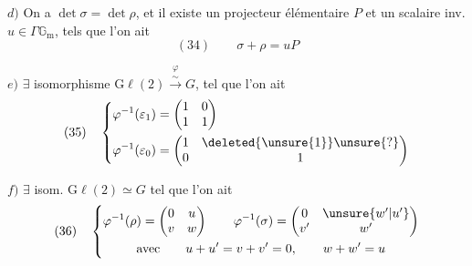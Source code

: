 $d)$ On a $\det\sigma=\det\rho$, et il existe un projecteur élémentaire $P$ et un scalaire inv. $u\in\Gamma\mathbb G_{\mathrm m}$, tels que l'on ait
\[
(34)\qquad \sigma+\rho=uP
\]




$e)$ $\exists$ isomorphisme $\mathrm{G}\ell(2)\overset{\varphi}{\xrightarrow{\sim}}G$,  tel que l'on ait
\[
(35)\quad\left\{\begin{aligned}
\varphi^{-1}(\varepsilon_1)&=\begin{pmatrix}1&0\\1&1\end{pmatrix}\\
\varphi^{-1}(\varepsilon_0)&=\begin{pmatrix}1&\deleted{\unsure{1}}\unsure{?}\\0&1\end{pmatrix}
\end{aligned}\right.
\]

$f)$ $\exists$ isom. $\mathrm{G}\ell(2)\simeq G$ tel que l'on ait
\[
(36)\quad\left\{\begin{gathered}
\varphi^{-1}(\rho)=\begin{pmatrix}0&u\\v&w\end{pmatrix}\qquad
\varphi^{-1}(\sigma)=\begin{pmatrix}0&\unsure{w'|u'}\\v'&w'\end{pmatrix}\\
\text{avec}\qquad u+u'=v+v'=0,\qquad w+w'=u
\end{gathered}\right.
\]

